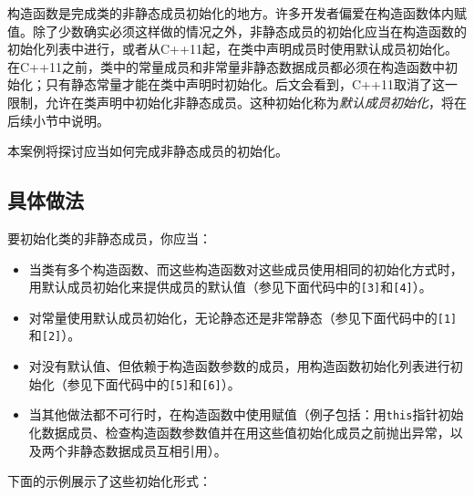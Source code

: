 
构造函数是完成类的非静态成员初始化的地方。许多开发者偏爱在构造函数体内赋值。除了少数确实必须这样做的情况之外，非静态成员的初始化应当在构造函数的初始化列表中进行，或者从C++11起，在类中声明成员时使用默认成员初始化。在C++11之前，类中的常量成员和非常量非静态数据成员都必须在构造函数中初始化；只有静态常量才能在类中声明时初始化。后文会看到，C++11取消了这一限制，允许在类声明中初始化非静态成员。这种初始化称为\textit{默认成员初始化}，将在后续小节中说明。



本案例将探讨应当如何完成非静态成员的初始化。



\subsection{具体做法}



要初始化类的非静态成员，你应当：



\begin{itemize}
\item 当类有多个构造函数、而这些构造函数对这些成员使用相同的初始化方式时，用默认成员初始化来提供成员的默认值（参见下面代码中的\texttt{[3]}和\texttt{[4]}）。



\item 对常量使用默认成员初始化，无论静态还是非常静态（参见下面代码中的\texttt{[1]}和\texttt{[2]}）。



\item 对没有默认值、但依赖于构造函数参数的成员，用构造函数初始化列表进行初始化（参见下面代码中的\texttt{[5]}和\texttt{[6]}）。



\item 当其他做法都不可行时，在构造函数中使用赋值（例子包括：用\texttt{this}指针初始化数据成员、检查构造函数参数值并在用这些值初始化成员之前抛出异常，以及两个非静态数据成员互相引用）。

\end{itemize}



下面的示例展示了这些初始化形式：



